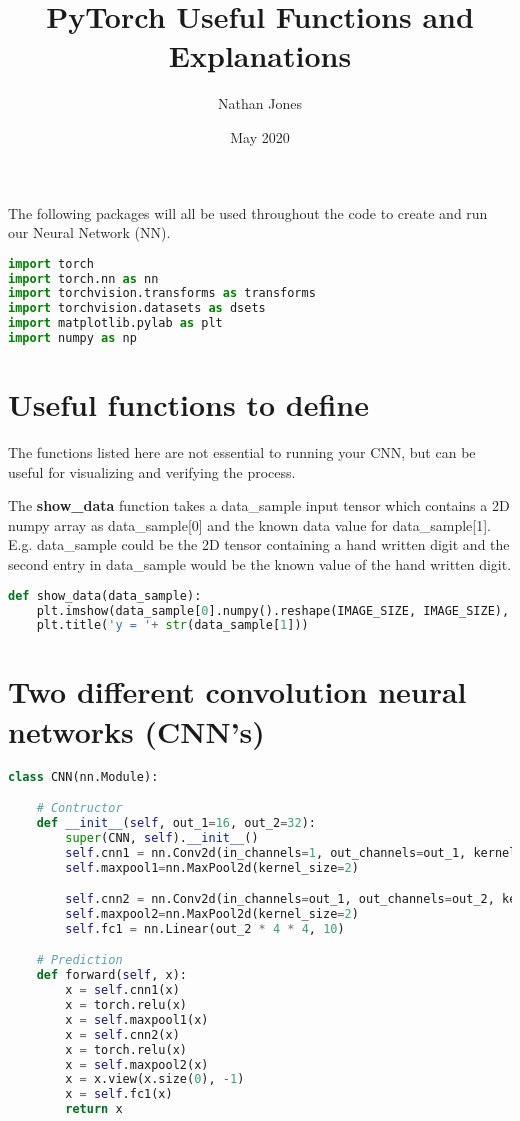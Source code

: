 \documentclass[12pt]{extarticle}
\title{PyTorch Useful Functions and Explanations}
\author{Nathan Jones}
\date{May 2020}
\newcommand{\<}{\langle}
\renewcommand{\>}{\rangle}
\theoremstyle{definition}
\newcommand{\newpara}{	\vskip 0.5cm }
\begin{document}
	
	\maketitle

The following packages will all be used throughout the code to create and run our Neural Network (NN).
	
\begin{lstlisting}[language= Python]
import torch 
import torch.nn as nn
import torchvision.transforms as transforms
import torchvision.datasets as dsets
import matplotlib.pylab as plt
import numpy as np
\end{lstlisting}

\section{Useful functions to define}

The functions listed here are not essential to running your CNN, but can be useful for visualizing and verifying the process. \newpara

The \textbf{show\_data} function takes a data\_sample input tensor which contains a 2D numpy array as data\_sample[0] and the known data value for data\_sample[1]. E.g. data\_sample could be the 2D tensor containing a hand written digit and the second entry in data\_sample would be the known value of the hand written digit.

\begin{lstlisting}[language=Python]
def show_data(data_sample):
	plt.imshow(data_sample[0].numpy().reshape(IMAGE_SIZE, IMAGE_SIZE), cmap='gray')
	plt.title('y = '+ str(data_sample[1]))
\end{lstlisting}

\section{Two different convolution neural networks (CNN's)}


\begin{lstlisting}[language=Python]
class CNN(nn.Module):

	# Contructor
	def __init__(self, out_1=16, out_2=32):
		super(CNN, self).__init__()
		self.cnn1 = nn.Conv2d(in_channels=1, out_channels=out_1, kernel_size=5, padding=2)
		self.maxpool1=nn.MaxPool2d(kernel_size=2)

		self.cnn2 = nn.Conv2d(in_channels=out_1, out_channels=out_2, kernel_size=5, stride=1, padding=2)
		self.maxpool2=nn.MaxPool2d(kernel_size=2)
		self.fc1 = nn.Linear(out_2 * 4 * 4, 10)

	# Prediction
	def forward(self, x):
		x = self.cnn1(x)
		x = torch.relu(x)
		x = self.maxpool1(x)
		x = self.cnn2(x)
		x = torch.relu(x)
		x = self.maxpool2(x)
		x = x.view(x.size(0), -1)
		x = self.fc1(x)
		return x
\end{lstlisting}



	
	
\end{document}
